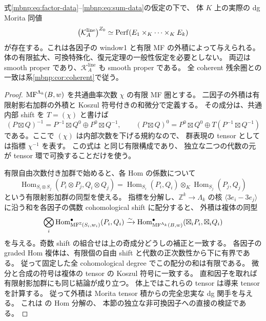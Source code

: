 \begin{theorem}
\label{mbnp:thm:product}
式\eqref{mbnp:eq:factor-data}--\eqref{mbnp:eq:sum-data}の仮定の下で、
体 $K$ 上の実際の dg Morita 同値
\begin{equation}\label{mbnp:eq:product}
 \bigl(\mathcal K_A^{\mathrm{line}}\bigr)^{Z_0}
     \simeq \operatorname{Perf}(E_1\times_K\cdots\times_KE_k)
\end{equation}
が存在する。これは各因子の window1 と有限 MF の外積によって与えられる。
体の有限拡大、可換特殊化、復元定理の一般性仮定を必要としない。
両辺は smooth proper であり、$\mathcal K_A^{\mathrm{line}}$ も smooth proper である。
全 coherent 残余圏との一致は系\ref{mbnp:cor:coherent}で従う。
\end{theorem}
\begin{proof}
$\operatorname{MF}^{\Lambda_k}(B,w)$ を共通曲率次数 $\chi$ の有限 MF 圏とする。
二因子の外積は有限射影右加群の外積と Koszul 符号付きの和微分で定義する。
その成分は、共通内部 shift を $T=(\chi)$ と書けば
\[
 (P\boxtimes Q)^{-1}=P^{-1}\boxtimes Q^0\oplus P^0\boxtimes Q^{-1},\qquad
 (P\boxtimes Q)^0=P^0\boxtimes Q^0\oplus T(P^{-1}\boxtimes Q^{-1})
\]
である。ここで $(\chi)$ は内部次数を下げる規約なので、
群表現の tensor としては指標 $\chi^{-1}$ を表す。
この式は \cite[Definition~3.51]{NFBFKKernels}と同じ有限構成であり、
独立な二つの代数の元が tensor 環で可換することだけを使う。

有限自由次数付き加群で始めると、各 Hom の係数について
\[
 \operatorname{Hom}_{S_i\otimes S_j}
     (P_i\otimes P_j,Q_i\otimes Q_j)
 =\operatorname{Hom}_{S_i}(P_i,Q_i)
      \otimes_K\operatorname{Hom}_{S_j}(P_j,Q_j)
\]
という有限射影加群の同型を使える。
指標を分解し、$\mathbb Z^k\to\Lambda_k$ の核
$\langle3e_i-3e_j\rangle$ に沿う和を各因子の偶数 cohomological shift に配分すると、
外積は複体の同型
\begin{equation}\label{mbnp:eq:hom}
 \bigotimes_i\operatorname{Hom}^\bullet_{\operatorname{MF}^{\mathbb Z}(S_i,w_i)}(P_i,Q_i)
 \xrightarrow{\sim}
 \operatorname{Hom}^\bullet_{\operatorname{MF}^{\Lambda_k}(B,w)}
       (\boxtimes_iP_i,\boxtimes_iQ_i)
\end{equation}
を与える。奇数 shift の組合せは上の奇成分どうしの補正と一致する。
各因子の graded Hom 複体は、有限個の自由 shift と代数の正次数性から下に有界である。
従って固定した全 cohomological degree でこの配分の和は有限である。
微分と合成の符号は複体の tensor の Koszul 符号に一致する。
直和因子を取れば有限射影加群にも同じ結論が成り立つ。
体上ではこれらの tensor は導来 tensor を計算する。
従って外積は Morita tensor 積からの完全忠実な dg 関手を与える。
これは \cite[Lemma~3.52の証明]{NFBFKKernels}の Hom 分解の、
本節の独立な非可換因子への直接の検証である。


\end{proof}
